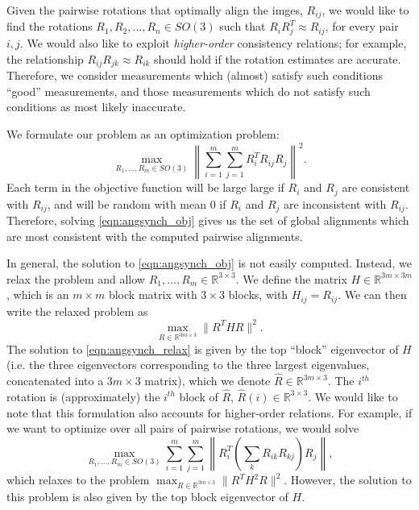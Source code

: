 \documentclass[11pt]{article}
\begin{document}
Given the pairwise rotations that optimally align the imges, $R_{ij}$, we would like to find the rotations $R_1, R_2, \dots, R_n \in SO(3)$ such that $R_i R_j^T \approx R_{ij}$, for every pair $i, j$. 
%
We would also like to exploit {\em higher-order} consistency relations;
for example, the relationship $R_{ij} R_{jk} \approx R_{ik}$ should hold if the rotation estimates are accurate.
%
Therefore, we consider measurements which (almost) satisfy such conditions ``good'' measurements, and those measurements which do not satisfy such conditions as most likely inaccurate.


We formulate our problem as an optimization problem:
\begin{equation} \label{eqn:angsynch_obj}
\max_{R_1, \dots, R_m \in SO(3)} \left\| \sum_{i=1}^{m} \sum_{j=1}^{m} R_i^T R_{ij} R_j \right\|^2.
\end{equation}
%
Each term in the objective function will be large large if $R_i$ and $R_j$ are consistent with $R_{ij}$, and will be random with mean 0 if $R_i$ and $R_j$ are inconsistent with $R_{ij}$.
%
Therefore, solving \eqref{eqn:angsynch_obj} gives us the set of global alignments which are most consistent with the computed pairwise alignments.

In general, the solution to \eqref{eqn:angsynch_obj} is not easily computed.
%
Instead, we relax the problem and allow $R_1, \dots, R_m \in \mathbb{R}^{3 \times 3}$.
%
We define the matrix $H \in \mathbb{R}^{3m \times 3m}$, which is an $m \times m$ block matrix with $3 \times 3$ blocks, with $H_{ij} = R_{ij}$.
%
We can then write the relaxed problem as 
\begin{equation} \label{eqn:angsynch_relax}
\max_{R\in \mathbb{R}^{3m \times 3}} \| R^T H R \|^2.
\end{equation}
%
The solution to \eqref{eqn:angsynch_relax} is given by the top ``block'' eigenvector of $H$ (i.e. the three eigenvectors corresponding to the three largest eigenvalues, concatenated into a $3m \times 3$ matrix), which we denote $\hat{R} \in \mathbb{R}^{3m \times 3}$. 
%
The $i^{th}$ rotation is (approximately) the $i^{th}$ block of $\hat{R}$, $\hat{R}(i) \in \mathbb{R}^{3 \times 3}$.
%
We would like to note that this formulation also accounts for higher-order relations.
%
For example, if we want to optimize over all pairs of pairwise rotations, we would solve 
\begin{equation}
\max_{R_1, \dots, R_m \in SO(3)} \sum_{i=1}^{m} \sum_{j=1}^{m} \left\| R_i^T \left( \sum_k R_{ik} R_{kj} \right) R_j \right\|,
\end{equation} 
%
which relaxes to the problem $ \max_{R \in \mathbb{R}^{3m \times 3}} \| R^T H^2 R \|^2$.
%
However, the solution to this problem is also given by the top block eigenvector of $H$. 
\end{document}
